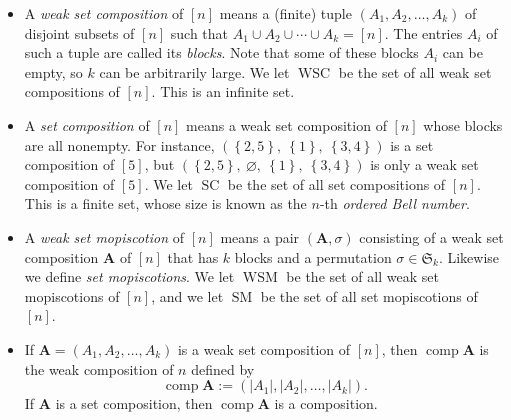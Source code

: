 \documentclass[numbers=enddot,12pt,final,onecolumn,notitlepage]{scrartcl}%
\theoremstyle{definition}
\begin{document}
\begin{itemize}
\item A \emph{weak set composition} of $\left[  n\right]  $ means a (finite)
tuple $\left(  A_{1},A_{2},\ldots,A_{k}\right)  $ of disjoint subsets of
$\left[  n\right]  $ such that $A_{1}\cup A_{2}\cup\cdots\cup A_{k}=\left[
n\right]  $. The entries $A_{i}$ of such a tuple are called its \emph{blocks}.
Note that some of these blocks $A_{i}$ can be empty, so $k$ can be arbitrarily
large. We let $\operatorname*{WSC}$ be the set of all weak set compositions of
$\left[  n\right]  $. This is an infinite set.

\item A \emph{set composition} of $\left[  n\right]  $ means a weak set
composition of $\left[  n\right]  $ whose blocks are all nonempty. For
instance, $\left(  \left\{  2,5\right\}  ,\ \left\{  1\right\}  ,\ \left\{
3,4\right\}  \right)  $ is a set composition of $\left[  5\right]  $, but
$\left(  \left\{  2,5\right\}  ,\ \varnothing,\ \left\{  1\right\}
,\ \left\{  3,4\right\}  \right)  $ is only a weak set composition of $\left[
5\right]  $. We let $\operatorname*{SC}$ be the set of all set compositions of
$\left[  n\right]  $. This is a finite set, whose size is known as the $n$-th
\emph{ordered Bell number}.

\item A \emph{weak set mopiscotion} of $\left[  n\right]  $ means a pair
$\left(  \mathbf{A},\sigma\right)  $ consisting of a weak set composition
$\mathbf{A}$ of $\left[  n\right]  $ that has $k$ blocks and a permutation
$\sigma\in\mathfrak{S}_{k}$. Likewise we define \emph{set mopiscotions}. We
let $\operatorname*{WSM}$ be the set of all weak set mopiscotions of $\left[
n\right]  $, and we let $\operatorname*{SM}$ be the set of all set
mopiscotions of $\left[  n\right]  $.

\item If $\mathbf{A}=\left(  A_{1},A_{2},\ldots,A_{k}\right)  $ is a weak set
composition of $\left[  n\right]  $, then $\operatorname*{comp}\mathbf{A}$ is
the weak composition of $n$ defined by%
\[
\operatorname*{comp}\mathbf{A}:=\left(  \left\vert A_{1}\right\vert
,\left\vert A_{2}\right\vert ,\ldots,\left\vert A_{k}\right\vert \right)  .
\]
If $\mathbf{A}$ is a set composition, then $\operatorname*{comp}\mathbf{A}$ is
a composition.


\end{itemize}
\end{document}
